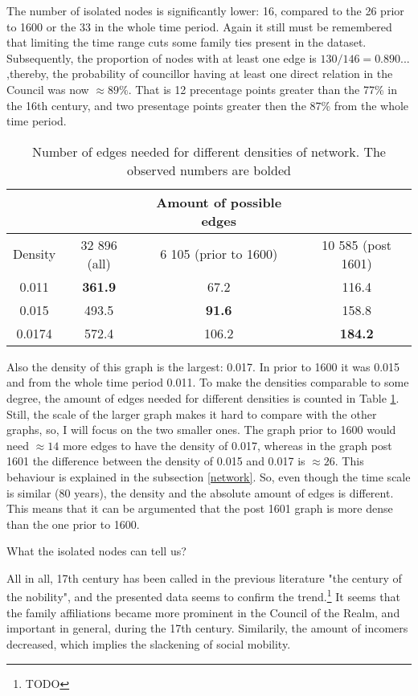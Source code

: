 The number of isolated nodes is significantly lower: 16, compared to the 26 prior to 1600 or the 33 in the whole time period. Again it still must be remembered that limiting the time range cuts some family ties present in the dataset. Subsequently, the proportion of nodes with at least one edge is $130/146=0.890...$ ,thereby, the probability of councillor having at least one direct relation in the Council was now $\approx 89\%$. That is 12 precentage points greater than the 77\% in the 16th century, and two presentage points greater then the 87\% from the whole time period.

\begin{table}
	\caption[Number of edges needed for different densities of network]{Number of edges needed for different densities of network. The observed numbers are bolded}
	\label{edges}
	\begin{tabular}{cccc}
		\hline
		&& Amount of possible edges & \\
		\hline
		Density & 32 896 (all) & 6 105 (prior to 1600) & 10 585 (post 1601) \\
		\hline 
		0.011 & \textbf{361.9} & 67.2 & 116.4 \\
		\hline
		0.015 & 493.5 & \textbf{91.6} & 158.8 \\
		\hline
		0.0174 & 572.4 & 106.2 & \textbf{184.2}\\
		\hline
	\end{tabular}
\end{table}

Also the density of this graph is the largest: 0.017. In prior to 1600 it was 0.015 and from the whole time period 0.011. To make the densities comparable to some degree, the amount of edges needed for different densities is counted in Table \ref{edges}. Still, the scale of the larger graph makes it hard to compare with the other graphs, so, I will focus on the two smaller ones. The graph prior to 1600 would need $\approx 14$ more edges to have the density of 0.017, whereas in the graph post 1601 the difference between the density of 0.015 and 0.017 is $\approx 26$. This behaviour is explained in the subsection \ref{network}. So, even though the time scale is similar (80 years), the density and the absolute amount of edges is different. This means that it can be argumented that the post 1601 graph is more dense than the one prior to 1600. 

What the isolated nodes can tell us?

All in all, 17th century has been called in the previous literature "the century of the nobility", and the presented data seems to confirm the trend.\footnote{TODO} It seems that the family affiliations became more prominent in the Council of the Realm, and important in general, during the 17th century. Similarily, the amount of incomers decreased, which implies the slackening of social mobility.


